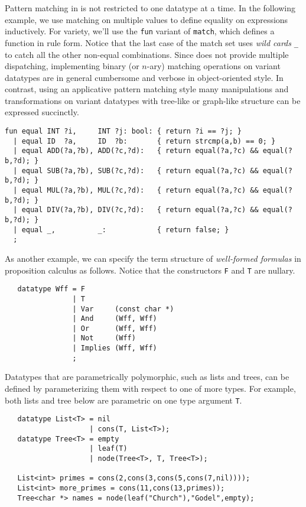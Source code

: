 Pattern matching in \Prop{} is not restricted to one datatype at
a time.  In the following example, we use matching on multiple values to
define equality on expressions inductively.  For variety, we'll
use the \verb|fun| variant of \verb|match|, which defines a function
in rule form.  Notice that the last case
of the match set uses {\em wild cards} \verb|_| to catch all the other
non-equal combinations.  Since \Cpp{} does not provide multiple dispatching,
implementing binary (or $n$-ary) matching operations on variant datatypes are
in general cumbersome and verbose in object-oriented style. In contrast,
using an applicative pattern matching style many manipulations and
transformations on variant datatypes with tree-like or graph-like structure
can be expressed succinctly.
 
\begin{verbatim}
fun equal INT ?i,     INT ?j: bool: { return ?i == ?j; }
  | equal ID  ?a,     ID  ?b:       { return strcmp(a,b) == 0; }
  | equal ADD(?a,?b), ADD(?c,?d):   { return equal(?a,?c) && equal(?b,?d); }
  | equal SUB(?a,?b), SUB(?c,?d):   { return equal(?a,?c) && equal(?b,?d); }
  | equal MUL(?a,?b), MUL(?c,?d):   { return equal(?a,?c) && equal(?b,?d); }
  | equal DIV(?a,?b), DIV(?c,?d):   { return equal(?a,?c) && equal(?b,?d); }
  | equal _,          _:            { return false; }
  ;
\end{verbatim}

 \label{sec:Wff}
 
  As another example, we can specify the term structure of
{\em well-formed formulas} in proposition calculus as follows.  Notice
that the constructors \verb|F| and \verb|T| are nullary.
 
\begin{verbatim}
   datatype Wff = F
                | T
                | Var     (const char *)
                | And     (Wff, Wff)
                | Or      (Wff, Wff)
                | Not     (Wff)
                | Implies (Wff, Wff)
                ;
\end{verbatim}
 
Datatypes that are parametrically polymorphic, such as lists and trees, can
be defined by parameterizing them with respect to one of more types.
For example, both lists and tree below are parametric on one type argument
\verb|T|.
 
\begin{verbatim}
   datatype List<T> = nil
                    | cons(T, List<T>);
   datatype Tree<T> = empty
                    | leaf(T)
                    | node(Tree<T>, T, Tree<T>);
 
   List<int> primes = cons(2,cons(3,cons(5,cons(7,nil))));
   List<int> more_primes = cons(11,cons(13,primes));
   Tree<char *> names = node(leaf("Church"),"Godel",empty);
\end{verbatim}
 
